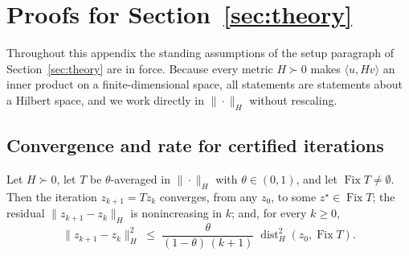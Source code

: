 \section{Proofs for Section~\ref{sec:theory}}
\label{app:theory}

Throughout this appendix the standing assumptions of the setup paragraph of
Section~\ref{sec:theory} are in force. Because every metric $H\succ0$ makes
$\langle u,Hv\rangle$ an inner product on a finite-dimensional space, all
statements are statements about a Hilbert space, and we work directly in
$\|\cdot\|_H$ without rescaling.

\subsection{Convergence and rate for certified iterations}

\begin{proposition}
\label{prop:km}
Let $H\succ0$, let $T$ be $\theta$-averaged in $\|\cdot\|_H$ with
$\theta\in(0,1)$, and let $\operatorname{Fix}T\neq\emptyset$. Then the
iteration $z_{k+1}=Tz_k$ converges, from any $z_0$, to some
$z^\star\in\operatorname{Fix}T$; the residual $\|z_{k+1}-z_k\|_H$ is
nonincreasing in $k$; and, for every $k\geq0$,
\begin{equation}
 \|z_{k+1}-z_k\|_H^2
 \;\leq\;
 \frac{\theta}{(1-\theta)\,(k+1)}\;
 \operatorname{dist}_H^2\!\left(z_0,\operatorname{Fix}T\right).
 \label{eq:km-rate}
\end{equation}
\end{proposition}

